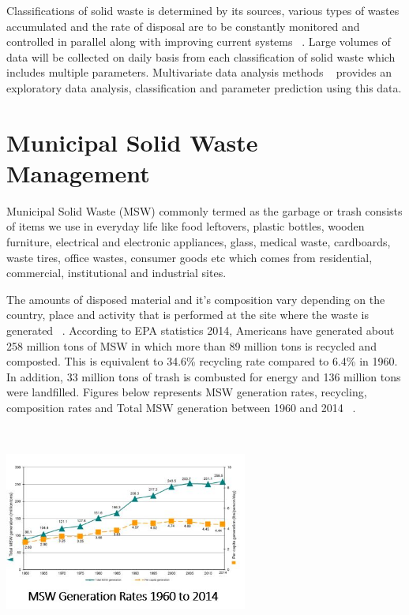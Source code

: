 \documentclass[sigconf]{acmart}
\begin{document}
Classifications of solid waste is determined by its sources, various types of wastes accumulated and the rate of disposal are to be constantly monitored and controlled in parallel along with improving current systems ~\cite{chandrappa2012}. Large volumes of data will be collected on daily basis from each classification of solid waste which includes multiple parameters. Multivariate data analysis methods ~\cite{bohm2013} provides an exploratory data analysis, classification and parameter prediction using this data.

\section{ Municipal Solid Waste Management}

Municipal Solid Waste (MSW) commonly termed as the garbage or trash consists of items we use in everyday life like food leftovers, plastic bottles, wooden furniture, electrical and electronic appliances, glass, medical waste, cardboards, waste tires, office wastes, consumer goods etc which comes from residential, commercial, institutional and industrial sites. 

The amounts of disposed material and it's composition vary depending on the country, place and activity that is performed at the site where the waste is generated ~\cite{chandrappa2012}. According to EPA statistics 2014, Americans have generated about 258 million tons of MSW in which more than 89 million tons is recycled and composted. This is equivalent to 34.6\% recycling rate compared to 6.4\% in 1960. In addition, 33 million tons of trash is combusted for energy and 136 million tons were landfilled. Figures below represents MSW generation rates, recycling, composition rates and Total MSW generation between 1960 and 2014 ~\cite{EPA2014}.

\includegraphics[width=8cm, height=7cm]{fig1.png}
\end{document}
